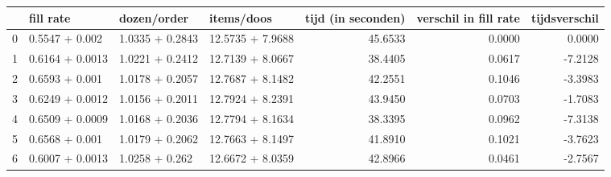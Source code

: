 \begin{tabular}{llllrrr}
\toprule
{} &        fill rate &      dozen/order &        items/doos &  tijd (in seconden) &  verschil in fill rate &  tijdsverschil \\
\midrule
0 &   0.5547 + 0.002 &  1.0335 + 0.2843 &  12.5735 + 7.9688 &             45.6533 &                 0.0000 &         0.0000 \\
1 &  0.6164 + 0.0013 &  1.0221 + 0.2412 &  12.7139 + 8.0667 &             38.4405 &                 0.0617 &        -7.2128 \\
2 &   0.6593 + 0.001 &  1.0178 + 0.2057 &  12.7687 + 8.1482 &             42.2551 &                 0.1046 &        -3.3983 \\
3 &  0.6249 + 0.0012 &  1.0156 + 0.2011 &  12.7924 + 8.2391 &             43.9450 &                 0.0703 &        -1.7083 \\
4 &  0.6509 + 0.0009 &  1.0168 + 0.2036 &  12.7794 + 8.1634 &             38.3395 &                 0.0962 &        -7.3138 \\
5 &   0.6568 + 0.001 &  1.0179 + 0.2062 &  12.7663 + 8.1497 &             41.8910 &                 0.1021 &        -3.7623 \\
6 &  0.6007 + 0.0013 &   1.0258 + 0.262 &  12.6672 + 8.0359 &             42.8966 &                 0.0461 &        -2.7567 \\
\bottomrule
\end{tabular}
